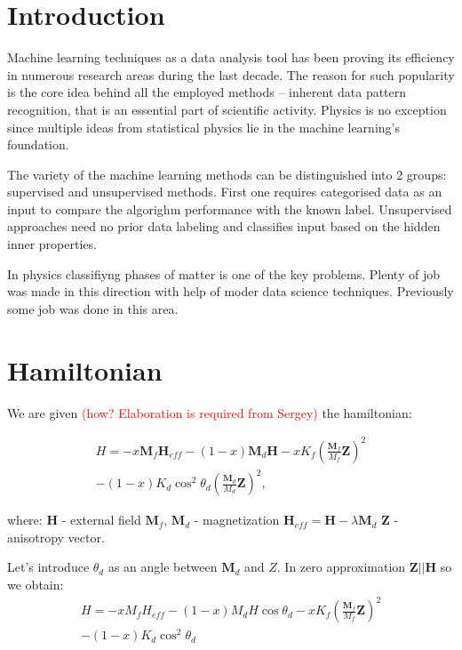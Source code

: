 \section{Introduction}

Machine learning techniques as a data analysis tool has been proving its efficiency in numerous research areas during the last decade.
The reason for such popularity is the core idea behind all the employed methods – inherent data pattern recognition, that is an essential part of scientific activity.
Physics is no exception since multiple ideas from statistical physics lie in the machine learning's foundation.

The variety of the machine learning methods can be distinguished into 2 groups: supervised and unsupervised methods.
First one requires categorised data as an input to compare the algorighm performance with the known label.
Unsupervised approaches need no prior data labeling and classifies input based on the hidden inner properties.

In physics classifiyng phases of matter is one of the key problems.
Plenty of job was made in this direction with help of moder data science techniques.
Previously some job was done in this area.

\section{Hamiltonian}

We are given \textcolor{red}{(how? Elaboration is required from Sergey)} the hamiltonian:

\begin{multline}
    H = -x\bm{M}_f\bm{H}_{eff}-(1-x)\bm{M}_d\bm{H}- xK_f\left(\frac{\bm{M}_f}{M_f}\bm{Z}\right)^2\\
    -(1-x)K_d\cos^2\theta_d\left(\frac{\bm{M}_d}{M_d}\bm{Z}\right)^2,
\end{multline}

where:
$\bm{H}$ - external field
$\bm{M}_f$, $\bm{M}_d$ - magnetization
$\bm{H}_{eff} = \bm{H} - \lambda\bm{M}_d$
$\bm{Z}$ - anisotropy vector.

Let's introduce $\theta_d$ as an angle between $\bm{M}_d$ and $Z$. In zero approximation $\bm{Z} || \bm{H}$ so we obtain:
\begin{multline}
    H = -xM_fH_{eff}-(1-x)M_dH\cos\theta_d- xK_f\left(\frac{\bm{M}_f}{M_f}\bm{Z}\right)^2\\
    -(1-x)K_d\cos^2\theta_d
\end{multline}

